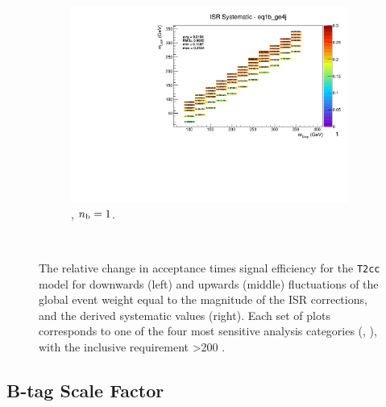 \begin{figure}[ht!]
\begin{subfigure}[b]{0.32\textwidth}
    \includegraphics[width=\textwidth, page=1]{Figs/sms/t2cc/v37/systs/T2cc_ISR_eq1b_ge4j.pdf}
    \caption{\njhigh, $n_{\text{b}} = 1$.}
  \end{subfigure}\\
  \caption{The relative change in acceptance times signal efficiency for the
  \texttt{T2cc} model for downwards (left) and upwards (middle) fluctuations
  of the global event weight equal to the magnitude of the ISR corrections,
  and the derived systematic values (right). Each set of plots corresponds
  to one of the four most sensitive analysis categories (\nb, \nj), with the
  inclusive requirement \HT>200 \gev.}
  \label{fig:sms-isr-t2cc}
\end{figure}


\newpage
\subsection*{B-tag Scale Factor}
\label{sec:t2cc_btag_plots}

